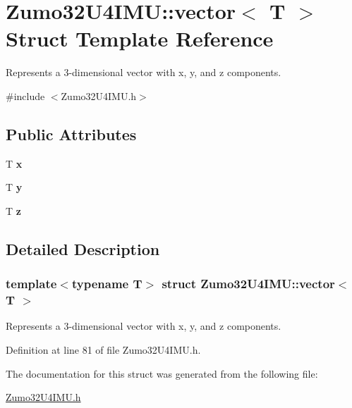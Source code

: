 \hypertarget{struct_zumo32_u4_i_m_u_1_1vector}{}\section{Zumo32\+U4\+I\+MU\+:\+:vector$<$ T $>$ Struct Template Reference}
\label{struct_zumo32_u4_i_m_u_1_1vector}


Represents a 3-\/dimensional vector with x, y, and z components.  




{\ttfamily \#include $<$Zumo32\+U4\+I\+M\+U.\+h$>$}

\subsection*{Public Attributes}
\begin{DoxyCompactItemize}
\item 
\mbox{\label{struct_zumo32_u4_i_m_u_1_1vector_a5e37cb6956780f070644342cfd3a3445}} 
T {\bfseries x}
\item 
\mbox{\label{struct_zumo32_u4_i_m_u_1_1vector_a17f578bba75257eb6a424d5df4a3ac37}} 
T {\bfseries y}
\item 
\mbox{\label{struct_zumo32_u4_i_m_u_1_1vector_adabd262931612a0909326f4292982874}} 
T {\bfseries z}
\end{DoxyCompactItemize}


\subsection{Detailed Description}
\subsubsection*{template$<$typename T$>$\newline
struct Zumo32\+U4\+I\+M\+U\+::vector$<$ T $>$}

Represents a 3-\/dimensional vector with x, y, and z components. 

Definition at line 81 of file Zumo32\+U4\+I\+M\+U.\+h.



The documentation for this struct was generated from the following file\+:\begin{DoxyCompactItemize}
\item 
\hyperlink{_zumo32_u4_i_m_u_8h}{Zumo32\+U4\+I\+M\+U.\+h}\end{DoxyCompactItemize}
